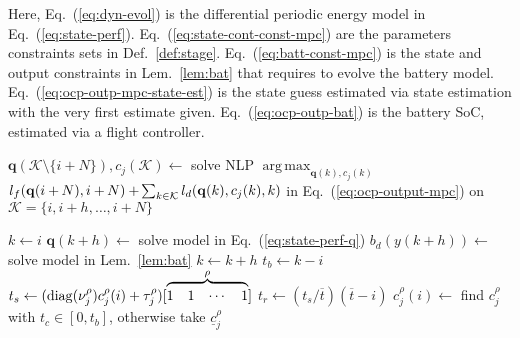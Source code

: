 \documentclass[letterpaper,10pt,journal,twoside]{IEEEtran}
\theoremstyle{definition}
\DeclareMathOperator*{\argmax}{arg\,max}
\begin{document}
Here, Eq.~(\ref{eq:dyn-evol}) is the differential periodic energy model in Eq.~(\ref{eq:state-perf}). Eq.~(\ref{eq:state-cont-const-mpc}) are the parameters constraints sets in Def.~\ref{def:stage}. Eq.~(\ref{eq:batt-const-mpc}) is the state and output constraints in Lem.~\ref{lem:bat} that requires to evolve the battery model. Eq.~(\ref{eq:ocp-outp-mpc-state-est}) is the state guess estimated via state estimation%
with the very first estimate given. Eq.~(\ref{eq:ocp-outp-bat}) is the battery SoC, estimated via a flight controller.

\begin{algorithm}[t]
  \begin{algorithmic}[1]
    \small
      \makeatletter
      \setcounter{ALC@line}{15}
      \makeatother
      \STATE $\mathbf{q}(\mathcal{K}\setminus\{i+N\}),c_j(\mathcal{K})\gets${ \vspace*{.3ex}solve NLP }$\argmax_{\mathbf{q}(k),c_j(k)}$ \vspace*{.7ex}\hspace*{1em}${l_f(\mathbf{q}(i+\hspace*{-.1ex}N),i+\hspace*{-.1ex}N)}+\hspace*{-.2ex}{\sum_{k\in\mathcal{K}}{l_d(\mathbf{q}(k),c_j(k),k)}}${ in Eq.~(\ref{eq:ocp-output-mpc}) \hspace*{1em}on }$\mathcal{K}=\{i,i+h,\dots,i+N\}$\vspace*{.3ex}\label{alg:mpc}
      
      \vspace*{.8ex}
      \STATE $k\gets i$\vspace*{.3ex}\label{alg:bat1}
      \vspace*{.3ex}
          \STATE $\mathbf{q}(k+h)\gets${ solve model in Eq.~(\ref{eq:state-perf-q})}\vspace*{.3ex}\label{alg:evol}
        \ENDIF
        \STATE $b_d(y(k+h))\gets${ solve model in Lem.~\ref{lem:bat}}\vspace*{.3ex}
        \STATE $k\gets k+h$\vspace*{.3ex}
      \ENDWHILE
      \STATE $t_b\gets k-i$\vspace*{.3ex}\label{alg:bat2}
      \STATE $t_s\gets(\mathrm{diag}(\nu_j^\rho)\vspace*{.3ex}c_j^\rho(i)+\tau_j^\rho)[\overbrace{\begin{matrix}1&1&\cdots&1\end{matrix}}^{\rho}]$\vspace*{.3ex}\label{alg:traj1}
      \STATE $t_r\gets(t_s/\overline{t})(\overline{t}-i)$\vspace*{.3ex}
        \STATE $c_j^{\rho}(i)\gets${ find }$c_j^{\rho}${ with }$t_c\in[0,t_b]${, otherwise take }$\underline{c}_j^\rho$\vspace*{.3ex}\label{alg:traj2}
      \ENDIF


\end{algorithmic}
\end{algorithm}
\end{document}
